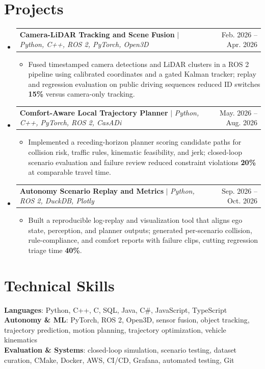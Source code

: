 \documentclass[letterpaper,11pt]{article}
\makeatletter
\newcommand{\resumeItem}[1]{
  \item\small{
    {#1 \vspace{-2pt}}
  }
}
\newcommand{\resumeProjectHeading}[2]{
    \item
    \begin{tabular*}{0.97\textwidth}{l@{\extracolsep{\fill}}r}
      \small#1 & #2 \\
    \end{tabular*}\vspace{-7pt}
}
\newcommand{\resumeSubHeadingListStart}{\begin{itemize}[leftmargin=0.15in, label={}]}
\newcommand{\resumeSubHeadingListEnd}{\end{itemize}}
\newcommand{\resumeItemListStart}{\begin{itemize}}
\newcommand{\resumeItemListEnd}{\end{itemize}\vspace{-5pt}}
\makeatother
\begin{document}
\section{Projects}
\resumeSubHeadingListStart
\resumeProjectHeading
{\textbf{Camera-LiDAR Tracking and Scene Fusion} $|$ \emph{Python, C++, ROS 2, PyTorch, Open3D}}{Feb. 2026 -- Apr. 2026}
\resumeItemListStart
\resumeItem{Fused timestamped camera detections and LiDAR clusters in a ROS 2 pipeline using calibrated coordinates and a gated Kalman tracker; replay and regression evaluation on public driving sequences reduced ID switches \textbf{15\%} versus camera-only tracking.}
\resumeItemListEnd
\resumeProjectHeading
{\textbf{Comfort-Aware Local Trajectory Planner} $|$ \emph{Python, C++, PyTorch, ROS 2, CasADi}}{May. 2026 -- Aug. 2026}
\resumeItemListStart
\resumeItem{Implemented a receding-horizon planner scoring candidate paths for collision risk, traffic rules, kinematic feasibility, and jerk; closed-loop scenario evaluation and failure review reduced constraint violations \textbf{20\%} at comparable travel time.}
\resumeItemListEnd
\resumeProjectHeading
{\textbf{Autonomy Scenario Replay and Metrics} $|$ \emph{Python, ROS 2, DuckDB, Plotly}}{Sep. 2026 -- Oct. 2026}
\resumeItemListStart
\resumeItem{Built a reproducible log-replay and visualization tool that aligns ego state, perception, and planner outputs; generated per-scenario collision, rule-compliance, and comfort reports with failure clips, cutting regression triage time \textbf{40\%}.}
\resumeItemListEnd
\resumeSubHeadingListEnd



%
\section{Technical Skills}
\begin{itemize}[leftmargin=0.15in, label={}]
  \small{\item{
        \textbf{Languages}{: Python, C++, C, SQL, Java, C\#, JavaScript, TypeScript} \\
        \textbf{Autonomy \& ML}{: PyTorch, ROS 2, Open3D, sensor fusion, object tracking, trajectory prediction, motion planning, trajectory optimization, vehicle kinematics} \\
        \textbf{Evaluation \& Systems}{: closed-loop simulation, scenario testing, dataset curation, CMake, Docker, AWS, CI/CD, Grafana, automated testing, Git}
        }}
\end{itemize}


\end{document}
